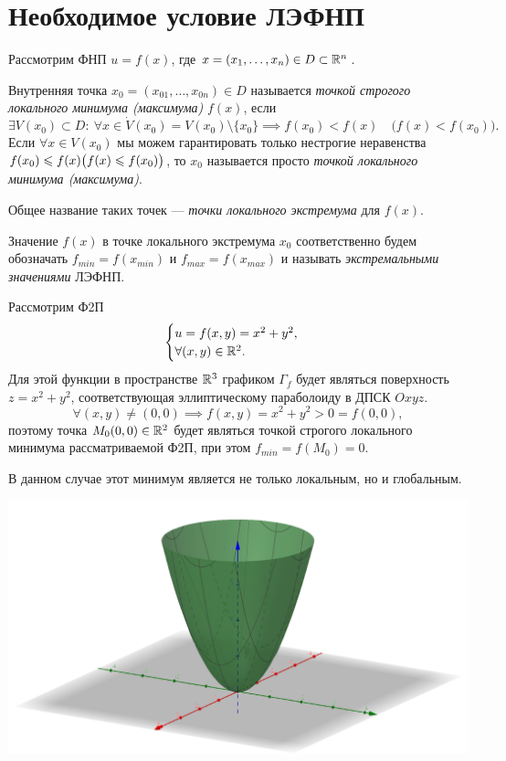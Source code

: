 \documentclass[../../main.tex]{subfiles}
\begin{document}
	\section{Необходимое условие ЛЭФНП}
	Рассмотрим ФНП $u = f (x)$,
	где $x = (x_1, \ldots, x_n) \in D \subset \R^n$.
	
	Внутренняя точка $x_0 = (x_{0 1}, \ldots, x_{0n}) \in D$
	называется \emph{точкой строгого локального минимума (максимума)}
	$f(x)$,
	если
	\[
		\exists V (x_0) \subset D:
		\ \forall x \in \dot{V} (x_0)
		= V (x_0) \setminus \{x_0\}
		\implies f (x_0) < f (x)
		\quad \big(f (x) < f (x_0)\big).
	\]
	Если $\forall x \in V (x_0)$ мы можем гарантировать
	только нестрогие неравенства $f (x_0) \le f (x)
	\\ \displaystyle
	\big(f (x) \le f (x_0)\big)$,
	то $x_0$ называется просто \emph{точкой локального минимума (максимума)}.
	
	Общее название таких точек
	--- \emph{точки локального экстремума} для $f (x)$.
	
	Значение $f (x)$ в точке локального экстремума $x_0$
	соответственно будем обозначать
	$f_{min} = f (x_{min})$ и $f_{max} = f (x_{max})$
	и называть \emph{экстремальными значениями} ЛЭФНП.
	
	\begin{exmp}
		Рассмотрим Ф2П
		\[
		\begin{cases}
			u = f (x, y) = x^2 + y^2, \\
			\forall (x, y) \in \R^2. \\
		\end{cases}
		\]
		Для этой функции в пространстве $\R^3$ графиком $\Gamma_f$
		будет являться поверхность $z = x^2 + y^2$,
		соответствующая эллиптическому параболоиду в ДПСК $Oxyz$.
		\[
			\forall (x, y) \ne (0, 0)
			\implies
			f (x, y) = x^2 + y^2 > 0 = f (0, 0),
		\]
		поэтому точка $M_0 (0, 0) \in \R^2$
		будет являться точкой строгого локального минимума рассматриваемой Ф2П,
		при этом $f_{min} = f (M_0) = 0$.
		
		В данном случае
		этот минимум является не только локальным, но и глобальным.
		
		\begin{center}
		\includegraphics[width=0.7\linewidth]{Ellyptic_paraboloid}
		\end{center}
	\end{exmp}
	
\end{document}
